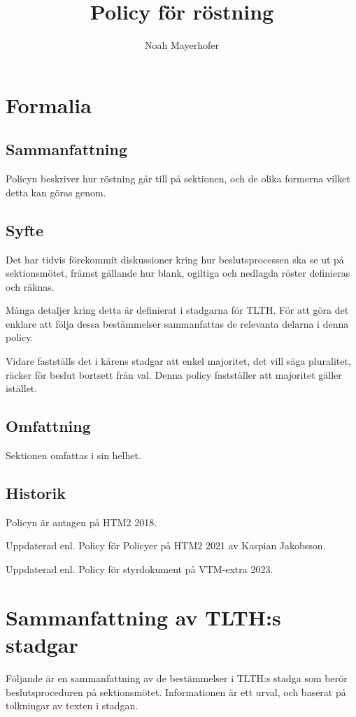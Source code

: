 \documentclass{dsekprotokoll}
\title{Policy för röstning}
\author{Noah Mayerhofer}
\begin{document}
\maketitle
\section{Formalia}
\subsection{Sammanfattning}
Policyn beskriver hur röstning går till på sektionen, och de olika formerna vilket detta kan göras genom.
\subsection{Syfte}
Det har tidvis förekommit diskussioner kring hur beslutsprocessen ska se ut på sektionsmötet,
främst gällande hur blank, ogiltiga och nedlagda röster definieras och räknas.


Många detaljer kring detta är definierat i stadgarna för TLTH. För att göra det enklare att följa
dessa bestämmelser sammanfattas de relevanta delarna i denna policy.


Vidare fastställs det i kårens stadgar att enkel majoritet, det vill säga pluralitet, räcker för beslut
bortsett från val. Denna policy fastställer att majoritet gäller istället.

\subsection{Omfattning}
Sektionen omfattas i sin helhet.

\subsection{Historik}
Policyn är antagen på HTM2 2018.

Uppdaterad enl. Policy för Policyer på HTM2 2021 av Kaspian Jakobsson.

Uppdaterad enl. Policy för styrdokument på VTM-extra 2023.


\section{Sammanfattning av TLTH:s stadgar}
Följande är en sammanfattning av de bestämmelser i TLTH:s stadga som berör beslutsproceduren på sektionsmötet. Informationen är ett urval, och baserat på tolkningar av texten i stadgan.
\end{document}
